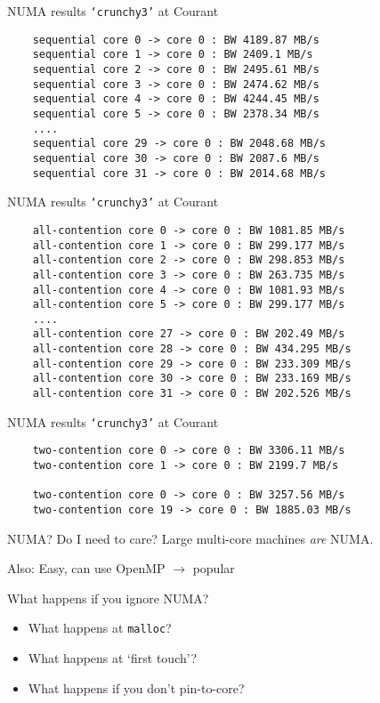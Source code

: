 \documentclass[english,compress]{beamer}
\begin{document}
\begin{frame}[fragile]{NUMA results}
  \texttt{`crunchy3'} at Courant

  \medskip
  \begin{lstlisting}
    sequential core 0 -> core 0 : BW 4189.87 MB/s
    sequential core 1 -> core 0 : BW 2409.1 MB/s
    sequential core 2 -> core 0 : BW 2495.61 MB/s
    sequential core 3 -> core 0 : BW 2474.62 MB/s
    sequential core 4 -> core 0 : BW 4244.45 MB/s
    sequential core 5 -> core 0 : BW 2378.34 MB/s
    ....
    sequential core 29 -> core 0 : BW 2048.68 MB/s
    sequential core 30 -> core 0 : BW 2087.6 MB/s
    sequential core 31 -> core 0 : BW 2014.68 MB/s
  \end{lstlisting}
\end{frame}
\begin{frame}[fragile]{NUMA results}
  \texttt{`crunchy3'} at Courant

  \medskip
  \begin{lstlisting}
    all-contention core 0 -> core 0 : BW 1081.85 MB/s
    all-contention core 1 -> core 0 : BW 299.177 MB/s
    all-contention core 2 -> core 0 : BW 298.853 MB/s
    all-contention core 3 -> core 0 : BW 263.735 MB/s
    all-contention core 4 -> core 0 : BW 1081.93 MB/s
    all-contention core 5 -> core 0 : BW 299.177 MB/s
    ....
    all-contention core 27 -> core 0 : BW 202.49 MB/s
    all-contention core 28 -> core 0 : BW 434.295 MB/s
    all-contention core 29 -> core 0 : BW 233.309 MB/s
    all-contention core 30 -> core 0 : BW 233.169 MB/s
    all-contention core 31 -> core 0 : BW 202.526 MB/s
  \end{lstlisting}
\end{frame}
\begin{frame}[fragile]{NUMA results}
  \texttt{`crunchy3'} at Courant

  \medskip
  \begin{lstlisting}
    two-contention core 0 -> core 0 : BW 3306.11 MB/s
    two-contention core 1 -> core 0 : BW 2199.7 MB/s

    two-contention core 0 -> core 0 : BW 3257.56 MB/s
    two-contention core 19 -> core 0 : BW 1885.03 MB/s
  \end{lstlisting}
\end{frame}
\begin{frame}{NUMA? Do I need to care?}
  Large multi-core machines \emph{are} NUMA.

  \bigskip
  Also: Easy, can use OpenMP $\rightarrow$ popular

  \bigskip
  What happens if you ignore NUMA?
  \begin{itemize}
    \item What happens at \texttt{malloc}?
    \item What happens at `first touch'?
    \item What happens if you don't pin-to-core?
  \end{itemize}
\end{frame}
\end{document}
